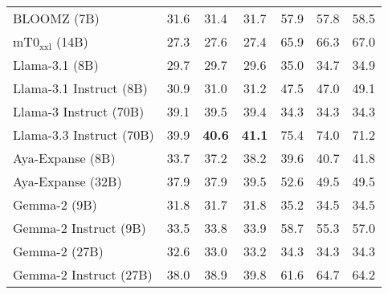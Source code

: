 \begin{table*}[t]
{\begin{tabular}{lcccccc}
BLOOMZ (7B)                             & 31.6         & 31.4           & 31.7                     & 57.9         & 57.8           & 58.5                       \\ \hdashline
mT0$_\text{xxl}$ (14B)                                     & 27.3          & 27.6            & 27.4                      & 65.9          & 66.3            & 67.0                         \\ \hdashline
Llama-3.1 (8B)                                & 29.7         & 29.7            & 29.6                      & 35.0          & 34.7            & 34.9                       \\
Llama-3.1 Instruct (8B)                       & 30.9         & 31.0             & 31.2                      & 47.5          & 47.0            & 49.1                       \\
Llama-3 Instruct (70B)                        & 39.1         & 39.5            & 39.4                      & 34.3          & 34.3            & 34.3                       \\
Llama-3.3 Instruct (70B)                      & 39.9         & \textbf{40.6}            & \textbf{41.1}                      & 75.4          & 74.0            & 71.2                       \\ 
\hdashline
Aya-Expanse (8B)                              & 33.7         & 37.2           & 38.2                      & 39.6         & 40.7            & 41.8                      \\
Aya-Expanse (32B)                             & 37.9         & 37.9            & 39.5                      & 52.6          & 49.5            & 49.5                       \\ 
\hdashline
Gemma-2 (9B)                                  & 31.8         & 31.7           & 31.8                     & 35.2         & 34.5           & 34.5                      \\
Gemma-2 Instruct (9B)                         & 33.5         & 33.8            & 33.9                     & 58.7          & 55.3           & 57.0                      \\
Gemma-2 (27B)                                 & 32.6         & 33.0            & 33.2                      & 34.3         & 34.3           & 34.3                      \\
Gemma-2 Instruct (27B)                        & 38.0         & 38.9           & 39.8                      & 61.6         & 64.7           & 64.2                      \\ 

\end{tabular}}
\end{table*}
